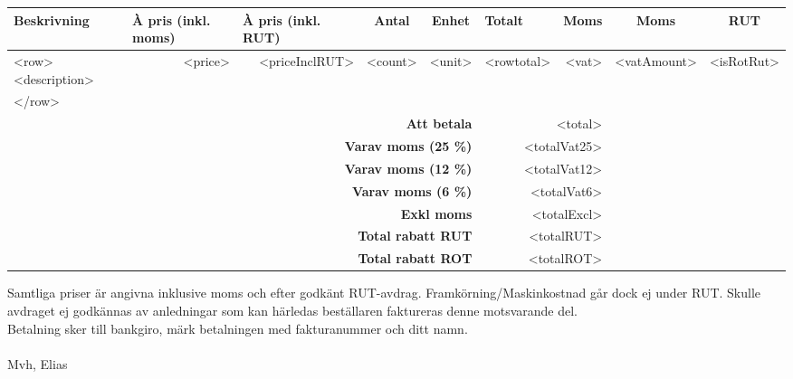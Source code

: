 \documentclass[a4paper,11pt]{extarticle}
\newcommand{\changefont}{%
        \fontsize{9}{11}\selectfont
    }
\begin{document}
\begin{tabularx}{\textwidth}{Xrrrrrrrc}
\rowcolor{Gray}
\changefont \textbf{Beskrivning} &
\multicolumn{1}{l}{\changefont \textbf{À pris (inkl. moms)}} &
\multicolumn{1}{l}{\changefont \textbf{À pris (inkl. RUT)}} &
\multicolumn{1}{c}{\changefont \textbf{Antal}} &
\multicolumn{1}{c}{\changefont \textbf{Enhet}} &
\multicolumn{1}{l}{\changefont \textbf{Totalt}} &
\multicolumn{1}{c}{\changefont \textbf{Moms}} &
\multicolumn{1}{c}{\changefont \textbf{Moms}} &
\changefont \textbf{RUT}\\
\hline
    <row><description> & <price> & <priceInclRUT> & <count> & <unit> & <rowtotal> & <vat> & <vatAmount> & <isRotRut>\\
    </row>
    & & & & & & \\
\hline
    \multicolumn{5}{r}{\textbf{Att betala}} & \multicolumn{2}{r}{<total>} \\
\multicolumn{5}{r}{\textbf{Varav moms (25 \%)}} & \multicolumn{2}{r}{<totalVat25>} \\
\multicolumn{5}{r}{\textbf{Varav moms (12 \%)}} & \multicolumn{2}{r}{<totalVat12>} \\
\multicolumn{5}{r}{\textbf{Varav moms (6 \%)}} & \multicolumn{2}{r}{<totalVat6>} \\
\multicolumn{5}{r}{\textbf{Exkl moms}} & \multicolumn{2}{r}{<totalExcl>} \\
\multicolumn{5}{r}{\textbf{Total rabatt RUT}} & \multicolumn{2}{r}{<totalRUT>} \\
\multicolumn{5}{r}{\textbf{Total rabatt ROT}} & \multicolumn{2}{r}{<totalROT>} \\
\hline
\end{tabularx}

\renewcommand\arraystretch{1}

\vspace{2em}
Samtliga priser är angivna inklusive moms och efter godkänt RUT-avdrag. Framkörning/Maskinkostnad går dock ej under RUT.
Skulle avdraget ej godkännas av anledningar som kan härledas beställaren faktureras denne motsvarande del. \\

Betalning sker till bankgiro, märk betalningen med fakturanummer och ditt namn. \\
~\\

Mvh, Elias

\end{document}
